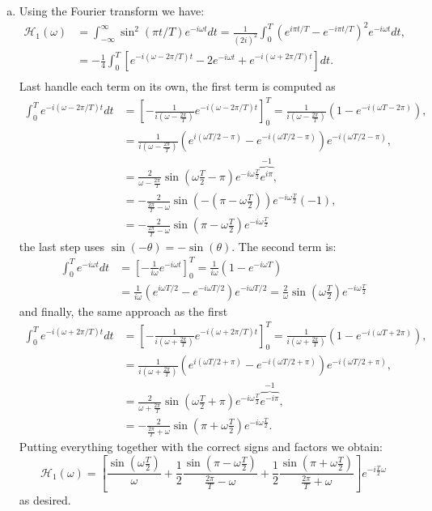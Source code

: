 \begin{enumerate}
\begin{enumerate}[a)]
\item Using the Fourier transform we have:
\begin{align*}
    \mathcal{H}_{1}(\omega)&=\int_{-\infty}^{\infty}\sin^{2}(\pi t/T)e^{-i\omega t}dt=\frac{1}{(2i)^{2}}\int_{0}^{T}\left(e^{i \pi t/T}-e^{-i\pi t/T}\right)^{2}e^{-i\omega t}dt, \\
    &=-\frac{1}{4}\int_{0}^{T}\left[e^{-i(\omega -2\pi/T)t}-2e^{-i\omega t}+e^{-i(\omega + 2\pi/T)t}\right]dt. \\
\end{align*}
Last handle each term on its own, the first term is computed as 
\begin{align*}
    \int_{0}^{T}e^{-i(\omega-2\pi/T)t}dt&=\left[-\frac{1}{i(\omega-\frac{2\pi}{T})}e^{-i(\omega-2\pi/T)t}\right]_{0}^{T}=\frac{1}{i(\omega-\frac{2\pi}{T})}(1-e^{-i(\omega T-2\pi)}), \\
    &=\frac{1}{i(\omega-\frac{2\pi}{T})}(e^{i(\omega T/2-\pi)}-e^{-i(\omega T/2-\pi)})e^{-i(\omega T/2-\pi)}, \\
    &=\frac{2}{\omega-\frac{2\pi}{T}}\sin\left(\omega\frac{T}{2}-\pi\right)e^{-i\omega\frac{T}{2}}\overbrace{e^{i\pi}}^{-1}, \\
    &=-\frac{2}{\frac{2\pi}{T}-\omega}\sin\left(-\left(\pi-\omega\frac{T}{2}\right)\right)e^{-i\omega\frac{T}{2}}(-1), \\
    &=-\frac{2}{\frac{2\pi}{T}-\omega}\sin\left(\pi-\omega\frac{T}{2}\right)e^{-i\omega\frac{T}{2}}
\end{align*}
the last step uses $\sin(-\theta)=-\sin(\theta)$. The second term is:
\begin{align*}
    \int_{0}^{T}e^{-i\omega t}dt&=\left[-\frac{1}{i\omega}e^{-i\omega t}\right]_{0}^{T}=\frac{1}{i\omega}(1-e^{-i\omega T}) \\
    &=\frac{1}{i\omega}(e^{i\omega T/2}-e^{-i\omega T/2})e^{-i\omega T/2}=\frac{2}{\omega}\sin\left(\omega\frac{T }{2}\right)e^{-i\omega\frac{T}{2}}
\end{align*}
and finally, the same approach as the first 
\begin{align*}
    \int_{0}^{T}e^{-i(\omega+2\pi/T)t}dt&=\left[-\frac{1}{i(\omega+\frac{2\pi}{T})}e^{-i(\omega+2\pi/T)t}\right]_{0}^{T}=\frac{1}{i(\omega+\frac{2\pi}{T})}(1-e^{-i(\omega T + 2\pi)}), \\
    &=\frac{1}{i(\omega+\frac{2\pi}{T})}(e^{i(\omega T/2+\pi)}-e^{-i(\omega T/2+\pi)})e^{-i(\omega T/2+\pi)}, \\
    &=\frac{2}{\omega+\frac{2\pi}{T}}\sin\left(\omega\frac{T}{2}+\pi\right)e^{-i\omega\frac{T}{2}}\overbrace{e^{-i\pi}}^{-1}, \\
    &=-\frac{2}{\frac{2\pi}{T}+\omega}\sin\left(\pi+\omega\frac{T}{2}\right)e^{-i\omega\frac{T}{2}}.
\end{align*}
Putting everything together with the correct signs and factors we obtain:
$$\mathcal{H}_{1}(\omega)=\left[\frac{\sin\left(\omega\frac{T }{2}\right)}{\omega}+\frac{1}{2}\frac{\sin\left(\pi-\omega\frac{T}{2}\right)}{\frac{2\pi}{T}-\omega}+\frac{1}{2}\frac{\sin\left(\pi+\omega\frac{T}{2}\right)}{\frac{2\pi}{T}+\omega}\right]e^{-i\frac{T}{2}\omega}$$
as desired.


\end{enumerate}
\end{enumerate}
